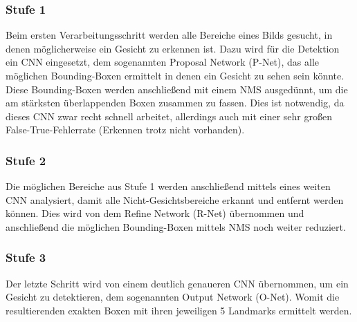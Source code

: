 \subsubsection{Stufe 1}
Beim ersten Verarbeitungsschritt werden alle Bereiche eines Bilds gesucht, in denen möglicherweise ein Gesicht zu erkennen ist. Dazu wird für die Detektion ein CNN eingesetzt, dem sogenannten Proposal Network (P-Net), das alle möglichen Bounding-Boxen ermittelt in denen ein Gesicht zu sehen sein könnte. Diese Bounding-Boxen werden anschließend mit einem NMS ausgedünnt, um die am stärksten überlappenden Boxen zusammen zu fassen. Dies ist notwendig, da dieses CNN zwar recht schnell arbeitet, allerdings auch mit einer sehr großen False-True-Fehlerrate (Erkennen trotz nicht vorhanden).
\subsubsection{Stufe 2}
Die möglichen Bereiche aus Stufe 1 werden anschließend mittels eines weiten CNN analysiert, damit alle Nicht-Gesichtsbereiche erkannt und entfernt werden können. Dies wird von dem Refine Network (R-Net) übernommen und anschließend die möglichen Bounding-Boxen mittels NMS noch weiter reduziert.
\subsubsection{Stufe 3}
Der letzte Schritt wird von einem deutlich genaueren CNN übernommen, um ein Gesicht zu detektieren, dem sogenannten Output Network (O-Net). Womit die resultierenden exakten Boxen mit ihren jeweiligen 5 Landmarks ermittelt werden.
